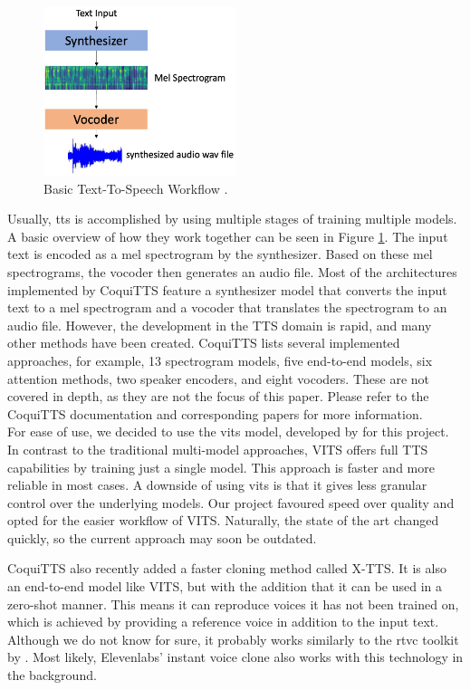 \documentclass[
  a4paper,  %
  twoside,  %
  bibliography=totoc,
  headsepline,
  cleardoublepage=empty,
  parskip=half,
  draft=false
]{scrbook}
\begin{document}
\begin{figure}[h]
  \centering
  \includegraphics[width=0.5\textwidth]{./graphics/tts/tts-workflow.png}
  \caption{Basic Text-To-Speech Workflow \cite{jemineRealTimeVoiceCloning2019}.}
  \label{fig:tts-explainer}
\end{figure}

Usually, \gls{tts} is accomplished by using multiple stages of training multiple models. A basic overview of how they work together can be seen in Figure \ref{fig:tts-explainer}. The input text is encoded as a mel spectrogram by the synthesizer. Based on these mel spectrograms, the vocoder then generates an audio file. Most of the architectures implemented by CoquiTTS feature a synthesizer model that converts the input text to a mel spectrogram and a vocoder that translates the spectrogram to an audio file. However, the development in the TTS domain is rapid, and many other methods have been created. CoquiTTS lists several implemented approaches, for example, 13 spectrogram models, five end-to-end models, six attention methods, two speaker encoders, and eight vocoders. These are not covered in depth, as they are not the focus of this paper. Please refer to the CoquiTTS documentation and corresponding papers for more information.\\
For ease of use, we decided to use the \gls{vits} model, developed by \citet{kimConditionalVariationalAutoencoder2021} for this project. In contrast to the traditional multi-model approaches, VITS offers full TTS capabilities by training just a single model. This approach is faster and more reliable in most cases. A downside of using \gls{vits} is that it gives less granular control over the underlying models. Our project favoured speed over quality and opted for the easier workflow of VITS. Naturally, the state of the art changed quickly, so the current approach may soon be outdated.

CoquiTTS also recently added a faster cloning method called X-TTS. It is also an end-to-end model like VITS, but with the addition that it can be used in a zero-shot manner. This means it can reproduce voices it has not been trained on, which is achieved by providing a reference voice in addition to the input text. Although we do not know for sure, it probably works similarly to the \gls{rtvc} toolkit by \citeauthor{jemineRealTimeVoiceCloning2019}. Most likely, Elevenlabs' instant voice clone also works with this technology in the background.
\end{document}
